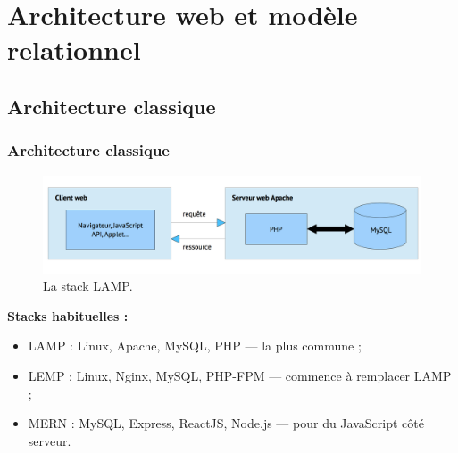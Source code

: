 \section{Architecture web et modèle relationnel}

    \subsection{Architecture classique}
    \begin{frame}
        \frametitle{Architecture classique}

        \begin{figure}[htb]
            \includegraphics[width=1\textwidth]{images/LAMP.png}
            \caption{La stack LAMP.}
        \end{figure}

        \textbf{Stacks habituelles :}
        \begin{itemize}
            \item LAMP : Linux, Apache, MySQL, PHP — la plus commune ;
            \item LEMP : Linux, Nginx, MySQL, PHP-FPM — commence à remplacer LAMP ;
            \item MERN : MySQL, Express, ReactJS, Node.js — pour du JavaScript côté serveur.
        \end{itemize}
    \end{frame}

